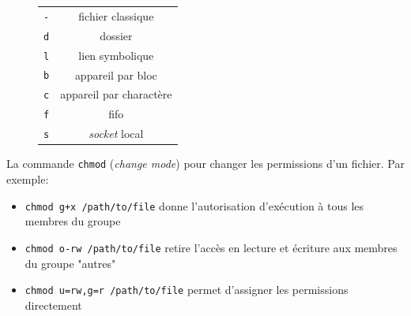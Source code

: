 \documentclass[french, toc]{../cs-classes/cs-classes}
\begin{document}
\begin{figure}[!ht]
    \centering
    \begin{tabular}{c c}
        \texttt{-} & fichier classique \\
        \texttt{d} & dossier \\
        \texttt{l} & lien symbolique \\
        \texttt{b} & appareil par bloc \\
        \texttt{c} & appareil par charactère \\
        \texttt{f} & fifo \\
        \texttt{s} & \emph{socket} local \\
    \end{tabular}
\end{figure}

La commande \texttt{chmod} (\emph{change mode}) pour changer les permissions d'un fichier. Par exemple:
\begin{itemize}
    \item \texttt{chmod g+x /path/to/file} donne l'autorisation d'exécution à tous les membres du groupe
    \item \texttt{chmod o-rw /path/to/file} retire l'accès en lecture et écriture aux membres du groupe "autres"
    \item \texttt{chmod u=rw,g=r /path/to/file} permet d'assigner les permissions directement
\end{itemize}
\end{document}
